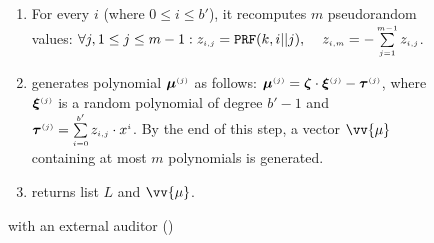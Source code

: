 \begin{figure}[ht]
\begin{center}
{\begin{tcolorbox}[enhanced,width=5.5in, 
    drop fuzzy shadow southwest,
    colframe=black,colback=white]
{{\begin{enumerate}
\begin{enumerate}
\item\label{ZSPA-A::gen-z} For every $i$ (where $0\leq i \leq b'$), it recomputes $m$ pseudorandom values: 
%
$\forall j, 1\leq j \leq m-1: z_{\scriptscriptstyle i,j}=\mathtt{PRF}(k,i||j), \hspace{4mm} z_{\scriptscriptstyle i,m}=-\sum\limits^{\scriptscriptstyle m-1}_{\scriptscriptstyle j=1}z_{\scriptscriptstyle i,j}$.
%
 \item generates polynomial $\bm\mu^{\scriptscriptstyle (j)}$ as follows: 
   $\bm\mu^{\scriptscriptstyle (j)} = \bm\zeta\cdot \bm\xi^{\scriptscriptstyle (j)}-\bm\tau^{\scriptscriptstyle (j)}$, 
    where $\bm\xi^{\scriptscriptstyle (j)}$ is a random polynomial of degree $b'-1$ and $\bm\tau^{\scriptscriptstyle (j)}=\sum\limits^{\scriptscriptstyle b'}_{\scriptscriptstyle i=0}z_{\scriptscriptstyle i,j}\cdot x^{\scriptscriptstyle i}$. By the end of this step, a vector $\vv{{\mu}}$ containing at most $m$ polynomials is generated. 
%
 \item returns   list $L$ and $\vv{{\mu}}$.
 
\end{enumerate}
 \end{enumerate}
}}
 \end{tcolorbox}
 }
\end{center}
\caption{\zspa with an external auditor (\zspaa)} 
\label{fig:arbiter}
\end{figure}



